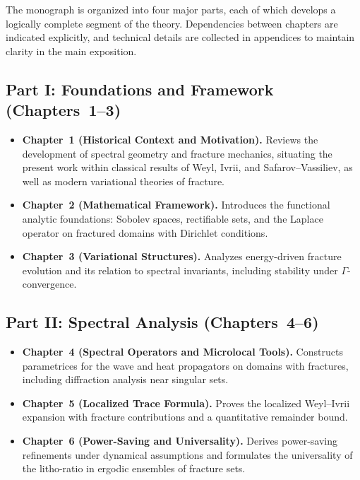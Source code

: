 The monograph is organized into four major parts, each of which develops
a logically complete segment of the theory. Dependencies between
chapters are indicated explicitly, and technical details are collected
in appendices to maintain clarity in the main exposition.

\subsection*{Part I: Foundations and Framework (Chapters~1--3)}

\begin{itemize}
    \item \textbf{Chapter~1 (Historical Context and Motivation).} Reviews
    the development of spectral geometry and fracture mechanics, situating
    the present work within classical results of Weyl, Ivrii, and
    Safarov–Vassiliev, as well as modern variational theories of
    fracture.
    \item \textbf{Chapter~2 (Mathematical Framework).} Introduces the
    functional analytic foundations: Sobolev spaces, rectifiable sets,
    and the Laplace operator on fractured domains with Dirichlet
    conditions.
    \item \textbf{Chapter~3 (Variational Structures).} Analyzes
    energy-driven fracture evolution and its relation to spectral
    invariants, including stability under $\Gamma$-convergence.
\end{itemize}

\subsection*{Part II: Spectral Analysis (Chapters~4--6)}

\begin{itemize}
    \item \textbf{Chapter~4 (Spectral Operators and Microlocal Tools).}
    Constructs parametrices for the wave and heat propagators on domains
    with fractures, including diffraction analysis near singular sets.
    \item \textbf{Chapter~5 (Localized Trace Formula).} Proves the
    localized Weyl–Ivrii expansion with fracture contributions and a
    quantitative remainder bound.
    \item \textbf{Chapter~6 (Power-Saving and Universality).} Derives
    power-saving refinements under dynamical assumptions and formulates
    the universality of the litho-ratio in ergodic ensembles of fracture
    sets.
\end{itemize}

